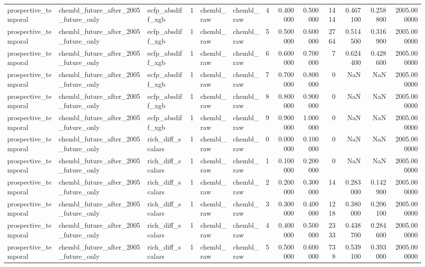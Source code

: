 \begin{longtable}{lllrllrrrrrrr}
prospective\_temporal & chembl\_future\_after\_2005\_future\_only & ecfp\_absdiff\_xgb & 1 & chembl\_raw & chembl\_raw & 4 & 0.400000 & 0.500000 & 1414 & 0.467100 & 0.258800 & 2005.000000 \\
prospective\_temporal & chembl\_future\_after\_2005\_future\_only & ecfp\_absdiff\_xgb & 1 & chembl\_raw & chembl\_raw & 5 & 0.500000 & 0.600000 & 2764 & 0.514500 & 0.316900 & 2005.000000 \\
prospective\_temporal & chembl\_future\_after\_2005\_future\_only & ecfp\_absdiff\_xgb & 1 & chembl\_raw & chembl\_raw & 6 & 0.600000 & 0.700000 & 7 & 0.624400 & 0.428600 & 2005.000000 \\
prospective\_temporal & chembl\_future\_after\_2005\_future\_only & ecfp\_absdiff\_xgb & 1 & chembl\_raw & chembl\_raw & 7 & 0.700000 & 0.800000 & 0 & NaN & NaN & 2005.000000 \\
prospective\_temporal & chembl\_future\_after\_2005\_future\_only & ecfp\_absdiff\_xgb & 1 & chembl\_raw & chembl\_raw & 8 & 0.800000 & 0.900000 & 0 & NaN & NaN & 2005.000000 \\
prospective\_temporal & chembl\_future\_after\_2005\_future\_only & ecfp\_absdiff\_xgb & 1 & chembl\_raw & chembl\_raw & 9 & 0.900000 & 1.000000 & 0 & NaN & NaN & 2005.000000 \\
prospective\_temporal & chembl\_future\_after\_2005\_future\_only & rich\_diff\_scalars & 1 & chembl\_raw & chembl\_raw & 0 & 0.000000 & 0.100000 & 0 & NaN & NaN & 2005.000000 \\
prospective\_temporal & chembl\_future\_after\_2005\_future\_only & rich\_diff\_scalars & 1 & chembl\_raw & chembl\_raw & 1 & 0.100000 & 0.200000 & 0 & NaN & NaN & 2005.000000 \\
prospective\_temporal & chembl\_future\_after\_2005\_future\_only & rich\_diff\_scalars & 1 & chembl\_raw & chembl\_raw & 2 & 0.200000 & 0.300000 & 14 & 0.283000 & 0.142900 & 2005.000000 \\
prospective\_temporal & chembl\_future\_after\_2005\_future\_only & rich\_diff\_scalars & 1 & chembl\_raw & chembl\_raw & 3 & 0.300000 & 0.400000 & 1218 & 0.380000 & 0.206100 & 2005.000000 \\
prospective\_temporal & chembl\_future\_after\_2005\_future\_only & rich\_diff\_scalars & 1 & chembl\_raw & chembl\_raw & 4 & 0.400000 & 0.500000 & 2333 & 0.438700 & 0.284600 & 2005.000000 \\
prospective\_temporal & chembl\_future\_after\_2005\_future\_only & rich\_diff\_scalars & 1 & chembl\_raw & chembl\_raw & 5 & 0.500000 & 0.600000 & 738 & 0.539100 & 0.393000 & 2005.000000 \\

\end{longtable}

